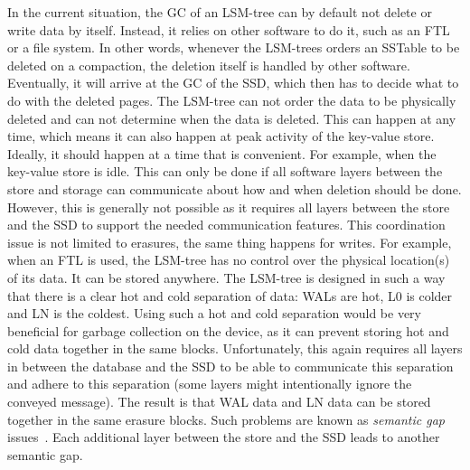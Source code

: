 In the current situation, the GC of an LSM-tree can by default not delete or write data by itself. Instead, it relies on other software to do it, such as an FTL or a file system. In other words, whenever the LSM-trees orders an SSTable to be deleted on a compaction, the deletion itself is handled by other software. Eventually, it will arrive at the GC of the SSD, which then has to decide what to do with the deleted pages. The LSM-tree can not order the data to be physically deleted and can not determine when the data is deleted. This can happen at any time, which means it can also happen at peak activity of the key-value store. Ideally, it should happen at a time that is convenient. For example, when the key-value store is idle. This can only be done if all software layers between the store and storage can communicate about how and when deletion should be done. However, this is generally not possible as it requires all layers between the store and the SSD to support the needed communication features. This coordination issue is not limited to erasures, the same thing happens for writes. For example, when an FTL is used, the LSM-tree has no control over the physical location(s) of its data. It can be stored anywhere. The LSM-tree is designed in such a way that there is a clear hot and cold separation of data: WALs are hot, L0 is colder and LN is the coldest. Using such a hot and cold separation would be very beneficial for garbage collection on the device, as it can prevent storing hot and cold data together in the same blocks. Unfortunately, this again requires all layers in between the database and the SSD to be able to communicate this separation and adhere to this separation (some layers might intentionally ignore the conveyed message). The result is that WAL data and LN data can be stored together in the same erasure blocks. Such problems are known as \textit{semantic gap} issues~\cite{zhang2017flashkv, shen2018didacache, bjorling2021zns, purandareappend}. Each additional layer between the store and the SSD leads to another semantic gap. 

